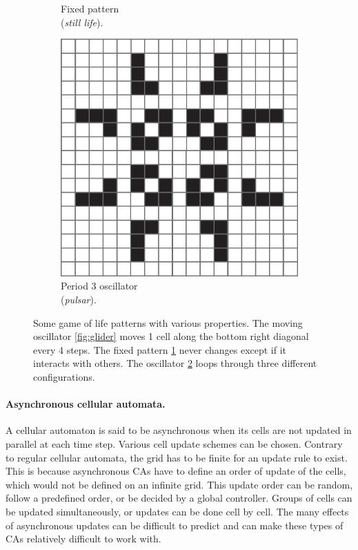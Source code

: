 \begin{figure}[htbp]
\begin{subfigure}[t]{.31\linewidth}
    \caption{Fixed pattern\\ (\emph{still life}).}
    \label{fig:still_life}
  \end{subfigure}
  \begin{subfigure}[t]{.31\linewidth}
    \centering
    \includegraphics[width=\linewidth]{figures/pulsar.pdf}
    \caption{Period 3 oscillator\\ (\emph{pulsar}).}
    \label{fig:pulsar}
  \end{subfigure}

  \caption{Some game of life patterns with various properties. The moving
    oscillator \ref{fig:glider} moves 1 cell along the bottom right diagonal
    every 4 steps. The fixed pattern \ref{fig:still_life} never changes except
    if it interacts with others. The oscillator \ref{fig:pulsar} loops through
    three different configurations.}
  \label{fig:gol_patterns}
\end{figure}


\paragraph{Asynchronous cellular automata.}
A cellular automaton is said to be asynchronous when its cells are not
updated in parallel at each time step. Various cell update schemes can be
chosen. Contrary to regular cellular automata, the grid has to be finite for an
update rule to exist. This is because asynchronous \acp{CA} have to define an
order of update of the cells, which would not be defined on an infinite grid.
This update order can be random, follow a predefined order, or be decided by a
global controller. Groups of cells can be updated simultaneously, or updates can
be done cell by cell. The many effects of asynchronous updates can be difficult
to predict and can make these types of \acp{CA} relatively difficult to work with.


